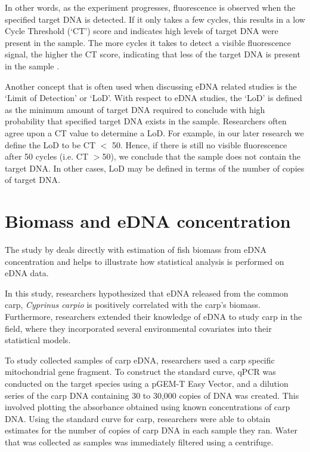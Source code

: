 \vspace{5mm}


In other words, as the experiment progresses, fluorescence is observed when the specified target DNA is detected. If it only takes a few cycles, this results in a low Cycle Threshold (`CT') score and indicates high levels of target DNA were present in the sample. The more cycles it takes to detect a visible fluorescence signal, the higher the CT score, indicating that less of the target DNA is present in the sample \citep{dropletqpcr,independentreplicates}.

\vspace{5mm}

Another concept that is often used when discussing eDNA related studies is the `Limit of Detection' or `LoD'. With respect to eDNA studies, the `LoD' is defined as the minimum amount of target DNA required to conclude with high probability that specified target DNA exists in the sample. Researchers often agree upon a CT value to determine a LoD. For example, in our later research we define the LoD to be CT $<$ 50. Hence, if there is still no visible fluorescence after 50 cycles (i.e. CT $>$50), we conclude that the sample does not contain the target DNA. In other cases, LoD may be defined in terms of the number of copies of target DNA.

\newpage

\section{Biomass and eDNA concentration}

The study by \cite{biomass} deals directly with estimation of fish biomass from eDNA concentration and helps to illustrate how statistical analysis is performed on eDNA data.

\vspace{5mm}

In this study, researchers hypothesized that eDNA released from the common carp, \textit{Cyprinus carpio} is positively correlated with the carp's biomass. Furthermore, researchers extended their knowledge of eDNA to study carp in the field, where they incorporated several environmental covariates into their statistical models.

\vspace{5mm}

To study collected samples of carp eDNA, researchers used a carp specific mitochondrial gene fragment. To construct the standard curve, qPCR was conducted on the target species using a pGEM-T Easy Vector, and a dilution series of the carp DNA containing 30 to 30,000 copies of DNA was created. This involved plotting the absorbance obtained using known concentrations of carp DNA. Using the standard curve for carp, researchers were able to obtain estimates for the number of copies of carp DNA in each sample they ran. Water that was collected as samples was immediately filtered using a centrifuge. 

